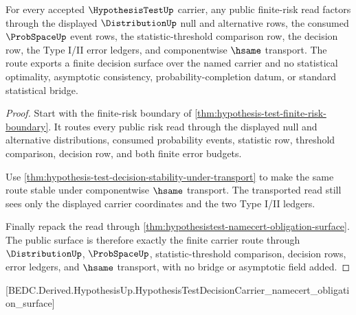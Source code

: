 \begin{theorem}
\label{thm:hypothesis-seed-public-route}
For every accepted $\HypothesisTestUp$ carrier, any public finite-risk read
factors through the displayed $\DistributionUp$ null and alternative rows, the
consumed $\ProbSpaceUp$ event rows, the statistic-threshold comparison row, the
decision row, the Type I/II error ledgers, and componentwise $\hsame$ transport.
The route exports a finite decision surface over the named carrier and no
statistical optimality, asymptotic consistency, probability-completion datum, or
standard statistical bridge.
\end{theorem}
\begin{proof}
Start with the finite-risk boundary of
\autoref{thm:hypothesis-test-finite-risk-boundary}. It routes every public risk
read through the displayed null and alternative distributions, consumed
probability events, statistic row, threshold comparison, decision row, and both
finite error budgets.

Use \autoref{thm:hypothesis-test-decision-stability-under-transport} to make the
same route stable under componentwise $\hsame$ transport. The transported read
still sees only the displayed carrier coordinates and the two Type I/II ledgers.

Finally repack the read through
\autoref{thm:hypothesistest-namecert-obligation-surface}. The public surface is
therefore exactly the finite carrier route through $\DistributionUp$,
$\ProbSpaceUp$, statistic-threshold comparison, decision rows, error ledgers, and
$\hsame$ transport, with no bridge or asymptotic field added.
\end{proof}

[BEDC.Derived.HypothesisUp.HypothesisTestDecisionCarrier\_namecert\_obligation\_surface]


